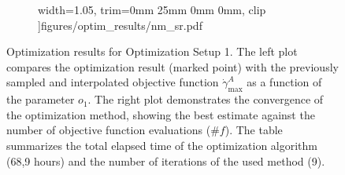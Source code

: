 \begin{figure}[H]
\begin{subfigure}{0.52\textwidth}
		width=1.05\textwidth,
		trim={0mm 25mm 0mm 0mm}, clip
		]{figures/optim_results/nm_sr.pdf}
	\end{subfigure}
	\vspace{2mm}
	\caption{Optimization results for Optimization Setup 1. The left plot compares the optimization result (marked point) with the previously sampled and interpolated objective function $\dot{\gamma}_{\text{max}}^{A}$ as a function of the parameter $o_1$. The right plot demonstrates the convergence of the optimization method, showing the best estimate against the number of objective function evaluations ($\# f$). The table summarizes the total elapsed time of the optimization algorithm (68,9 hours) and the number of iterations of the used method (9).}
\end{figure}
\newpage